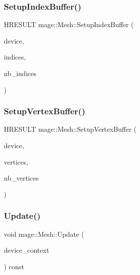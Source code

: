 \subsubsection{\texorpdfstring{Setup\+Index\+Buffer()}{SetupIndexBuffer()}}
{\footnotesize\ttfamily H\+R\+E\+S\+U\+LT mage\+::\+Mesh\+::\+Setup\+Index\+Buffer (\begin{DoxyParamCaption}\item[{\hyperlink{namespacemage_ae74f374780900893caa5555d1031fd79}{Com\+Ptr}$<$ I\+D3\+D11\+Device2 $>$}]{device,  }\item[{const uint32\+\_\+t $\ast$}]{indices,  }\item[{size\+\_\+t}]{nb\+\_\+indices }\end{DoxyParamCaption})\hspace{0.3cm}{\ttfamily [protected]}}

\hypertarget{classmage_1_1_mesh_a227af05ff8cbb1ad676c93dc8dc5d14b}{}\label{classmage_1_1_mesh_a227af05ff8cbb1ad676c93dc8dc5d14b} 
\subsubsection{\texorpdfstring{Setup\+Vertex\+Buffer()}{SetupVertexBuffer()}}
{\footnotesize\ttfamily H\+R\+E\+S\+U\+LT mage\+::\+Mesh\+::\+Setup\+Vertex\+Buffer (\begin{DoxyParamCaption}\item[{\hyperlink{namespacemage_ae74f374780900893caa5555d1031fd79}{Com\+Ptr}$<$ I\+D3\+D11\+Device2 $>$}]{device,  }\item[{const \hyperlink{structmage_1_1_vertex_position_normal_texture}{Vertex\+Position\+Normal\+Texture} $\ast$}]{vertices,  }\item[{size\+\_\+t}]{nb\+\_\+vertices }\end{DoxyParamCaption})\hspace{0.3cm}{\ttfamily [protected]}}

\hypertarget{classmage_1_1_mesh_acef4f55140f0f842791ea4dfa25b7598}{}\label{classmage_1_1_mesh_acef4f55140f0f842791ea4dfa25b7598} 
\subsubsection{\texorpdfstring{Update()}{Update()}}
{\footnotesize\ttfamily void mage\+::\+Mesh\+::\+Update (\begin{DoxyParamCaption}\item[{\hyperlink{namespacemage_ae74f374780900893caa5555d1031fd79}{Com\+Ptr}$<$ I\+D3\+D11\+Device\+Context2 $>$}]{device\+\_\+context }\end{DoxyParamCaption}) const}



